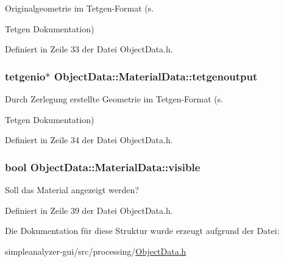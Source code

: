 Originalgeometrie im Tetgen-\/\-Format (s. 

Tetgen Dokumentation) 

Definiert in Zeile 33 der Datei Object\-Data.\-h.

\hypertarget{structObjectData_1_1MaterialData_a15d576cfe25abe334e34eb5e4671d6d7}{
\subsubsection[{tetgenoutput}]{\setlength{\rightskip}{0pt plus 5cm}tetgenio$\ast$ Object\-Data\-::\-Material\-Data\-::tetgenoutput}}\label{structObjectData_1_1MaterialData_a15d576cfe25abe334e34eb5e4671d6d7}


Durch Zerlegung erstellte Geometrie im Tetgen-\/\-Format (s. 

Tetgen Dokumentation) 

Definiert in Zeile 34 der Datei Object\-Data.\-h.

\hypertarget{structObjectData_1_1MaterialData_a37980da11f6b51b30eb41c3ab4e9674a}{
\subsubsection[{visible}]{\setlength{\rightskip}{0pt plus 5cm}bool Object\-Data\-::\-Material\-Data\-::visible}}\label{structObjectData_1_1MaterialData_a37980da11f6b51b30eb41c3ab4e9674a}


Soll das Material angezeigt werden? 



Definiert in Zeile 39 der Datei Object\-Data.\-h.



Die Dokumentation für diese Struktur wurde erzeugt aufgrund der Datei\-:\begin{DoxyCompactItemize}
\item 
simpleanalyzer-\/gui/src/processing/\hyperlink{ObjectData_8h}{Object\-Data.\-h}\end{DoxyCompactItemize}
